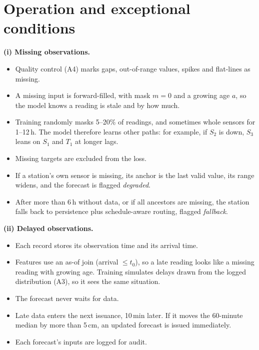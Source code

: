 \documentclass[11pt,a4paper]{article}
\begin{document}
\section{Operation and exceptional conditions}\label{sec:ops}
\textbf{(i) Missing observations.}
\begin{itemize}
  \item Quality control (A4) marks gaps, out-of-range values, spikes and
        flat-lines as missing.
  \item A missing input is forward-filled, with mask $m=0$ and a growing age
        $a$, so the model knows a reading is stale and by how much.
  \item Training randomly masks 5--20\% of readings, and sometimes whole sensors
        for 1--12\,h. The model therefore learns other paths: for example, if
        $S_2$ is down, $S_3$ leans on $S_1$ and $T_1$ at longer lags.
  \item Missing targets are excluded from the loss.
  \item If a station's own sensor is missing, its anchor is the last valid
        value, its range widens, and the forecast is flagged \emph{degraded}.
  \item After more than 6\,h without data, or if all ancestors are missing, the
        station falls back to persistence plus schedule-aware routing,
        flagged \emph{fallback}.
\end{itemize}

\textbf{(ii) Delayed observations.}
\begin{itemize}
  \item Each record stores its observation time and its arrival time.
  \item Features use an as-of join (arrival $\le t_0$), so a late reading looks
        like a missing reading with growing age. Training simulates delays
        drawn from the logged distribution (A3), so it sees the same
        situation.
  \item The forecast never waits for data.
  \item Late data enters the next issuance, 10\,min later. If it moves the
        60-minute median by more than 5\,cm, an updated forecast is issued
        immediately.
  \item Each forecast's inputs are logged for audit.
\end{itemize}
\end{document}
